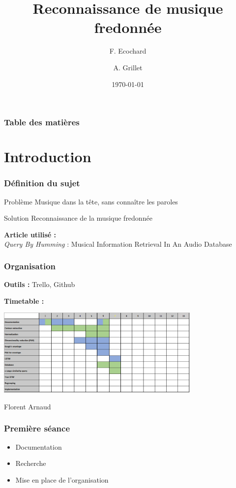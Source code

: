 \documentclass{beamer}
\title{Reconnaissance de musique fredonnée}
\author{F. Ecochard \and A. Grillet}
\institute{ENSEIRB-Mmk, Département électronique}
\date{\today}
\begin{document}
	\begin{frame}
		\titlepage
	\end{frame}
	\begin{frame}
		\frametitle{Table des matières}
		\tableofcontents
	\end{frame}

\section{Introduction}
	\begin{frame}
		\frametitle{Définition du sujet}
		\begin{alertblock}{Problème} %
			Musique dans la tête, sans connaître les paroles
		\end{alertblock}
		\begin{exampleblock}{Solution} %
			Reconnaissance de la musique fredonnée
		\end{exampleblock}
		\textbf{Article utilisé :} \\
		\textit{Query By Humming} : Musical Information Retrieval In An Audio Database
	\end{frame}
	\begin{frame}
		\frametitle{Organisation}
		\textbf{Outils : }Trello, Github
		
		\textbf{Timetable :}
		\begin{center}
			\includegraphics[width=10cm]{orga.PNG}
		\end{center}
		\colorbox[HTML]{A9D08E}{\textcolor[HTML]{FFFFFF}{Florent}}
		\colorbox[HTML]{8ea9db}{\textcolor[HTML]{FFFFFF}{Arnaud}}
	\end{frame}
	\begin{frame}
		\frametitle{Première séance}
		\begin{itemize}
			\item Documentation
			\item Recherche
			\item Mise en place de l'organisation
		\end{itemize}
	\end{frame}
\end{document}
